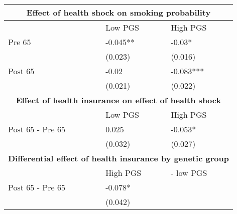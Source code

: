 % 
\begin{tabular}{lll}
  \toprule
  \multicolumn{3}{c}{ \textbf{Effect of health shock on smoking probability}} \\
 \midrule
 & Low PGS & High PGS \\ 
   \midrule
Pre 65 & -0.045** & -0.03* \\ 
   & (0.023) & (0.016) \\ 
  Post 65 & -0.02 & -0.083*** \\ 
   & (0.021) & (0.022) \\ 
   \toprule \multicolumn{3}{c}{ \textbf{Effect of health insurance on effect of health shock}} \\
 \midrule
 & Low PGS & High PGS \\ 
   \midrule
Post 65 - Pre 65 & 0.025 & -0.053* \\ 
   & (0.032) & (0.027) \\ 
   \toprule \multicolumn{3}{c}{ \textbf{Differential effect of health insurance by genetic group}} \\
 \midrule
 & High PGS  & - low PGS \\ 
   \midrule
Post 65 - Pre 65 & -0.078* &  \\ 
   & (0.042) &  \\ 
   \bottomrule
\end{tabular}
